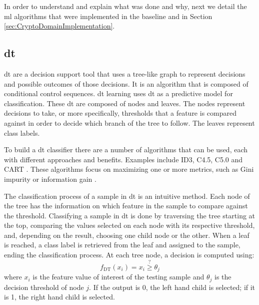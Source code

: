 In order to understand and explain what was done and why, next we detail the \ac{ml} algorithms that were implemented in the baseline and in Section \ref{sec:CryptoDomainImplementation}.

\subsection{\acl{dt}}
\label{ssec:DecisionTrees}

\ac{dt} \cite{quinlan1987simplifying} are a decision support tool that uses a tree-like graph to represent decisions and possible outcomes of those decisions. It is an algorithm that is composed of conditional control sequences. \ac{dt} learning uses \ac{dt} as a predictive model for classification.
These \ac{dt} are composed of nodes and leaves. The nodes represent decisions to take, or more specifically, thresholds that a feature is compared against in order to decide which branch of the tree to follow. The leaves represent class labels.

To build a \ac{dt} classifier there are a number of algorithms that can be used, each with different approaches and benefits. Examples include ID3, C4.5, C5.0 and CART \cite{strobl2009introduction}. These algorithms focus on maximizing one or more metrics, such as Gini impurity or information gain \cite{rokach2005top}.

The classification process of a sample in \ac{dt} is an intuitive method. Each node of the tree has the information on which feature in the sample to compare against the threshold. Classifying a sample in \ac{dt} is done by traversing the tree starting at the top, comparing the values selected on each node with its respective threshold, and, depending on the result, choosing one child node or the other. When a leaf is reached, a class label is retrieved from the leaf and assigned to the sample, ending the classification process. At each tree node, a decision is computed using:
\begin{equation}
\label{eq:dt}
f_{\text{DT}}(x_{i}) = x_{i} \stackrel{?}{\geq} \theta_{j}
\end{equation}
where $x_i$ is the feature value of interest of the testing sample and $\theta_{j}$ is the decision threshold of node $j$. If the output is 0, the left hand child is selected; if it is 1, the right hand child is selected.



